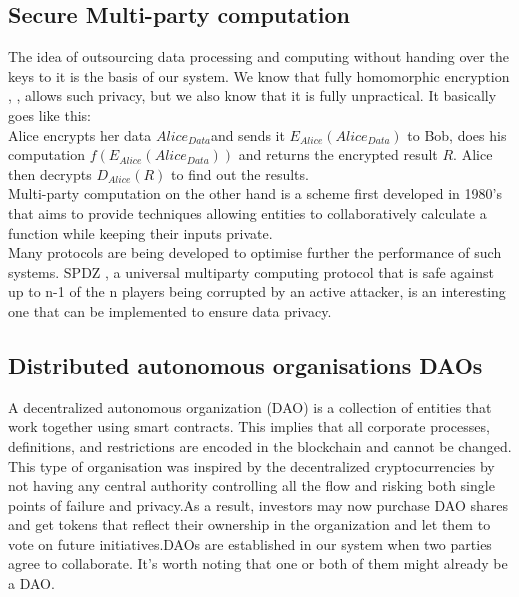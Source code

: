 \documentclass[conference]{IEEEtran}
\begin{document}
\subsection{Secure Multi-party computation}\label{SMPC}
The idea of outsourcing data processing and computing without handing over the keys to it is the basis of our system. We know that fully homomorphic encryption \cite{lee2022privacy}, \cite{gentry2009fully}, allows such privacy, but we also know that it is fully unpractical. It basically goes like this:\\
Alice encrypts her data $Alice_{Data}$and sends it $E_{Alice}(Alice_{Data})$ to Bob, does his computation $f(E_{Alice}(Alice_{Data}))$ and returns the encrypted result $R$. Alice then decrypts $D_{Alice}(R)$ to find out the results.\\
Multi-party computation \cite{goldreich1998secure} on the other hand is a scheme first developed in 1980’s that aims to provide techniques allowing entities to collaboratively calculate a function while keeping their inputs private.\\
Many protocols are being developed to optimise further the performance of such systems. SPDZ \cite{damgaard2013practical}, a universal multiparty computing protocol that is safe against up to n-1 of the n players being corrupted by an active attacker, is an interesting one that can be implemented to ensure data privacy.

\subsection{Distributed autonomous organisations DAOs}
A decentralized autonomous organization \cite{sims2019blockchain} (DAO) is a collection of entities that work together using smart contracts. This implies that all corporate processes, definitions, and restrictions are encoded in the blockchain and cannot be changed.
This type of organisation was inspired by the decentralized cryptocurrencies by not having any central authority controlling all the flow and risking both single points of failure and privacy.As a result, investors may now purchase DAO shares and get tokens that reflect their ownership in the organization and let them to vote on future initiatives.DAOs are established in our system when two parties agree to collaborate. It's worth noting that one or both of them might already be a DAO.
\end{document}
